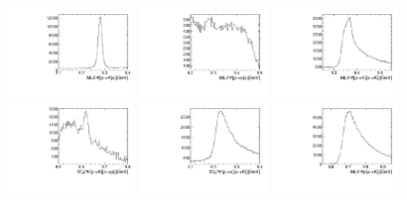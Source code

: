 \begin{figure}[!tbh]
\centering
\begin{minipage}[t]{1.0\textwidth}
\centering
\includegraphics[width=0.3\textwidth]{Figures/04_Penta/02_selection/draw_veto_pic/Lb_mass_P2K}
\includegraphics[width=0.3\textwidth]{Figures/04_Penta/02_selection/draw_veto_pic/Lb_mass_P2Pi}
\includegraphics[width=0.3\textwidth]{Figures/04_Penta/02_selection/draw_veto_pic/Lb_mass_PPi2KK} \\
\includegraphics[width=0.3\textwidth]{Figures/04_Penta/02_selection/draw_veto_pic/Lb_mass_PPi2KP}
\includegraphics[width=0.3\textwidth]{Figures/04_Penta/02_selection/draw_veto_pic/Lb_mass_PPi2PiK}
\includegraphics[width=0.3\textwidth]{Figures/04_Penta/02_selection/draw_veto_pic/Lb_mass_Pi2K} 

\end{minipage}
\end{figure}
